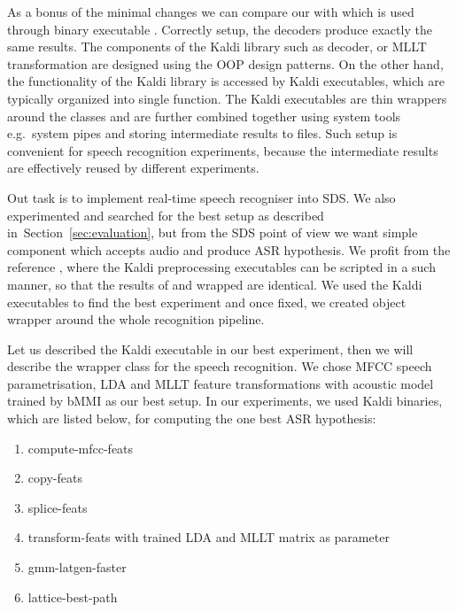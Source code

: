 As a bonus of the minimal changes we can compare our \/ 
with \/ which is used through binary executable .
Correctly setup, the decoders produce exactly the same results.
The components of the Kaldi library such as decoder, or \ac{MLLT} transformation are designed using 
the \ac{OOP} design patterns.
On the other hand, the functionality of the Kaldi library is accessed by Kaldi executables, 
which are typically organized into single function.
The Kaldi executables are thin wrappers around the classes and 
are further combined together using system tools e.g.\ system pipes
and storing intermediate results to files. 
Such setup is convenient for speech recognition experiments, because the intermediate results are  
effectively reused by different experiments.

Out task is to implement real-time speech recogniser into \acl{SDS}.
We also experimented and searched for the best setup as described in~Section~\ref{sec:evaluation},
but from the \ac{SDS} point of view we want simple component which accepts audio and produce \ac{ASR} hypothesis.
We profit from the reference , where the Kaldi preprocessing executables
can be scripted in a such manner, so that the results of \/ 
and wrapped \/ are identical.
We used the Kaldi executables to find the best experiment and once fixed,
we created object wrapper around the whole recognition pipeline.

Let us described the Kaldi executable in our best experiment,
then we will describe the wrapper class for the speech recognition.
We chose \ac{MFCC} speech parametrisation, \ac{LDA} and \ac{MLLT} feature transformations with 
acoustic model trained by \ac{bMMI} as our best setup.
In our experiments, we used Kaldi binaries, which are listed below, 
for computing the one best \ac{ASR} hypothesis:
\begin{enumerate}
    \item compute-mfcc-feats
    \item copy-feats
    \item splice-feats
    \item transform-feats with trained \ac{LDA} and \ac{MLLT} matrix as parameter
    \item \label{enum:latgen} gmm-latgen-faster
    \item lattice-best-path
\end{enumerate}

